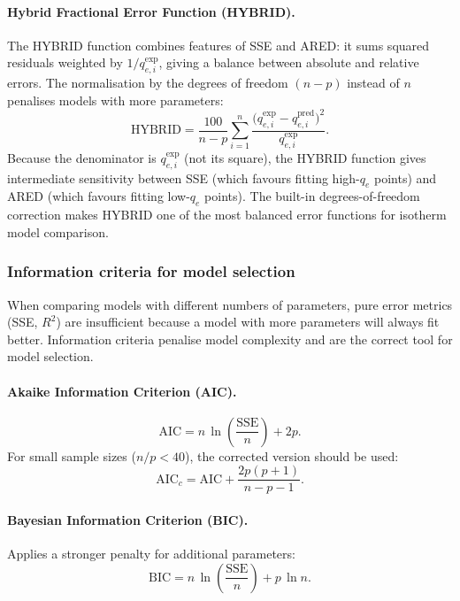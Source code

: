 	\paragraph{Hybrid Fractional Error Function (HYBRID).}
	The HYBRID function combines features of SSE and ARED: it sums
	squared residuals weighted by $1/q_{e,i}^{\exp}$, giving a
	balance between absolute and relative errors. The normalisation
	by the degrees of freedom $(n-p)$ instead of $n$ penalises
	models with more parameters:
	\begin{equation}
		\mathrm{HYBRID}
		= \frac{100}{n - p}\sum_{i=1}^{n}
		\frac{\bigl(q_{e,i}^{\exp} - q_{e,i}^{\mathrm{pred}}\bigr)^{2}}
		{q_{e,i}^{\exp}}.
		\label{eq:HYBRID}
	\end{equation}
	Because the denominator is $q_{e,i}^{\exp}$ (not its square),
	the HYBRID function gives intermediate sensitivity between SSE
	(which favours fitting high-$q_e$ points) and ARED (which
	favours fitting low-$q_e$ points). The built-in degrees-of-freedom
	correction makes HYBRID one of the most balanced error functions
	for isotherm model comparison.

	\subsubsection{Information criteria for model selection}

	When comparing models with different numbers of parameters, pure
	error metrics (SSE, $R^{2}$) are insufficient because a model with
	more parameters will always fit better. Information criteria
	penalise model complexity and are the correct tool for model
	selection.

	\paragraph{Akaike Information Criterion (AIC).}
	\begin{equation}
		\mathrm{AIC}
		= n\,\ln\!\left(\frac{\mathrm{SSE}}{n}\right) + 2p.
		\label{eq:AIC}
	\end{equation}
	For small sample sizes ($n/p < 40$), the corrected version should
	be used:
	\begin{equation}
		\mathrm{AIC}_c
		= \mathrm{AIC} + \frac{2p(p+1)}{n - p - 1}.
		\label{eq:AICc}
	\end{equation}

	\paragraph{Bayesian Information Criterion (BIC).}
	Applies a stronger penalty for additional parameters:
	\begin{equation}
		\mathrm{BIC}
		= n\,\ln\!\left(\frac{\mathrm{SSE}}{n}\right)
		+ p\,\ln n.
		\label{eq:BIC}
	\end{equation}


